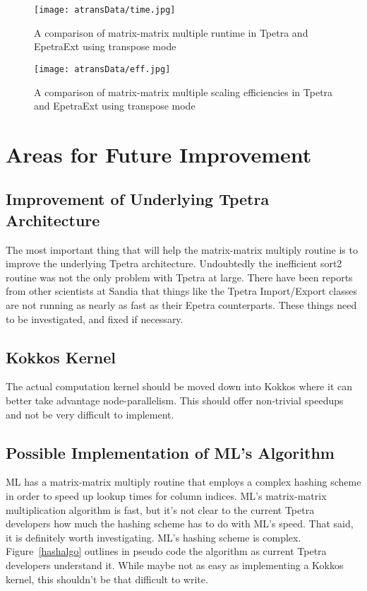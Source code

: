 \documentclass{article}
\begin{document}
\begin{figure}
\texttt{[image: atransData/time.jpg]}
\caption[Time Comparison]{A comparison of matrix-matrix multiple runtime in Tpetra and EpetraExt using transpose mode}
\label{transtime}
\end{figure}

\begin{figure}
\texttt{[image: atransData/eff.jpg]}
\caption[Efficiency Comparison]{A comparison of matrix-matrix multiple scaling efficiencies in Tpetra and EpetraExt using transpose mode}
\label{transeff}
\end{figure}

\section{Areas for Future Improvement}
\subsection{Improvement of Underlying Tpetra Architecture}
The most important thing that will help the matrix-matrix multiply routine is to improve the underlying Tpetra architecture. 
Undoubtedly the inefficient sort2 routine was not the only problem with Tpetra at large. There have been reports from other 
scientists at Sandia that things like the Tpetra Import/Export classes are not running as nearly as fast as their Epetra 
counterparts. These things need to be investigated, and fixed if necessary.

\subsection{Kokkos Kernel}
The actual computation kernel should be moved down into Kokkos where it can better take advantage node-parallelism. 
This should offer non-trivial speedups and not be very difficult to implement.

\subsection{Possible Implementation of ML's Algorithm}
ML has a matrix-matrix multiply routine that employs a complex hashing scheme in order to speed up lookup times for 
column indices. ML's matrix-matrix multiplication algorithm is fast, but it's not clear to the current Tpetra developers 
how much the hashing scheme has to do with ML's speed. That said, it is definitely worth investigating. ML's hashing scheme 
is complex. Figure~\ref{hashalgo} outlines in pseudo code the algorithm as current Tpetra developers 
understand it. While maybe not as easy as implementing a Kokkos kernel, this shouldn't be that difficult to write.
\end{document}
